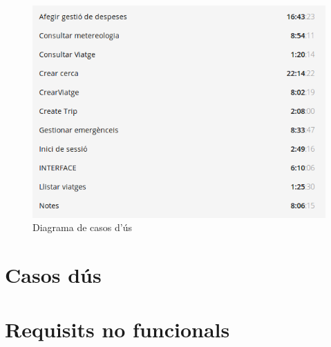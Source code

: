 \begin{figure}[!h]
\centering
\includegraphics[scale=0.65]{Figures/toggl.jpg}
\caption{Diagrama de casos d'ús}
\end{figure}

\section{Casos dús}

\section{Requisits no funcionals}
